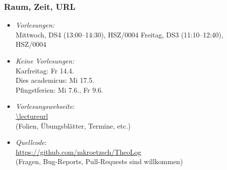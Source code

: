 \documentclass[onlymath]{beamer}
\begin{document}
\maketitle



% 
% 

\begin{frame}\frametitle{Raum, Zeit, URL}

\begin{itemize}
\item \emph{Vorlesungen:}\\
	Mittwoch, DS4 (13:00--14:30), HSZ/0004
	Freitag, DS3 (11:10--12:40), HSZ/0004\\
\item \emph{Keine Vorlesungen:}\\
	Karfreitag: Fr 14.4.\\
	Dies academicus: Mi 17.5.\\
	Pfingstferien: Mi 7.6., Fr 9.6.
\item \emph{Vorlesungswebseite}:\\[1ex]
	\url{\lectureurl}\\[1ex]
	(Folien, Übungsblätter, Termine, etc.)
\item \emph{Quellcode}:\\[1ex]
	\url{https://github.com/mkroetzsch/TheoLog}\\[1ex]
 	(Fragen, Bug-Reports, Pull-Requests sind willkommen)
\end{itemize}

\end{frame}
\end{document}
